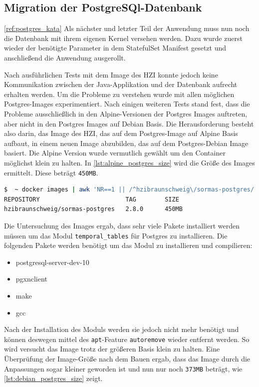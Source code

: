 \subsection{Migration der PostgreSQl-Datenbank}
\ref{ref:postgres_kata}
Als nächster und letzter Teil der Anwendung muss nun noch die Datenbank mit ihrem eigenen Kernel versehen werden.
Dazu wurde zuerst wieder der benötigte Parameter in dem StatefulSet Manifest gesetzt und anschließend die Anwendung ausgerollt.

Nach ausführlichen Tests mit dem Image des \ac{HZI} konnte jedoch keine Kommunikation zwischen der Java-Applikation und der Datenbank aufrecht erhalten werden.
Um die Probleme zu verstehen wurde mit allen möglichen Postgres-Images experimentiert.
Nach einigen weiteren Tests stand fest, dass die Probleme ausschließlich in den Alpine-Versionen der Postgres Images auftreten, aber nicht in den Postgres Images auf Debian Basis. 
Die Herausforderung besteht also darin, das Image des \ac{HZI}, das auf dem Postgres-Image auf Alpine Basis aufbaut, in einem neuen Image abzubilden, das auf dem Postgres-Debian Image basiert.
Die Alpine Version wurde vermutlich gewählt um den Container möglichst klein zu halten. 
In \ref{lst:alpine_postgres_size} wird die Größe des Images ermittelt.
Diese beträgt \texttt{450MB}.

\begin{lstlisting}[language=bash, caption={Größe des Postgres Images}, label=lst:alpine_postgres_size]
$  ~ docker images | awk 'NR==1 || /^hzibraunschweig\/sormas-postgres/ {printf "%-33s %-10s %s\n", $1, $2, $NF}'
REPOSITORY                        TAG        SIZE
hzibraunschweig/sormas-postgres   2.8.0      450MB
\end{lstlisting}

Die Untersuchung des Images ergab, dass sehr viele Pakete installiert werden müssen um das Modul \texttt{temporal\_tables} für Postgres zu installieren.
Die folgenden Pakete werden benötigt um das Modul zu installieren und compilieren:
\begin{itemize}
  \item postgresql-server-dev-10
  \item pgxnclient 
  \item make
  \item gcc
\end{itemize}

Nach der Installation des Moduls werden sie jedoch nicht mehr benötigt und können deswegen mittel des \texttt{apt}-Feature \texttt{autoremove} wieder entfernt werden. 
So wird versucht das Image trotz der größeren Basis klein zu halten.
Eine Überprüfung der Image-Größe nach dem Bauen ergab, dass das Image durch die Anpassungen sogar kleiner geworden ist und nun nur noch \texttt{373MB} beträgt, wie \ref{lst:debian_postgres_size} zeigt.

